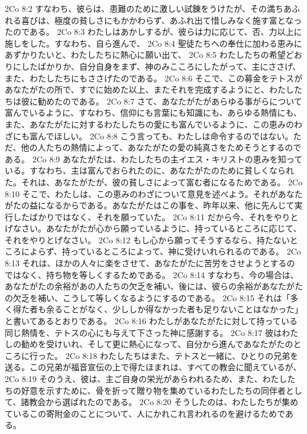 2Co 8:2  すなわち、彼らは、患難のために激しい試錬をうけたが、その満ちあふれる喜びは、極度の貧しさにもかかわらず、あふれ出て惜しみなく施す富となったのである。
2Co 8:3  わたしはあかしするが、彼らは力に応じて、否、力以上に施しをした。すなわち、自ら進んで、
2Co 8:4  聖徒たちへの奉仕に加わる恵みにあずかりたいと、わたしたちに熱心に願い出て、
2Co 8:5  わたしたちの希望どおりにしたばかりか、自分自身をまず、神のみこころにしたがって、主にささげ、また、わたしたちにもささげたのである。
2Co 8:6  そこで、この募金をテトスがあなたがたの所で、すでに始めた以上、またそれを完成するようにと、わたしたちは彼に勧めたのである。
2Co 8:7  さて、あなたがたがあらゆる事がらについて富んでいるように、すなわち、信仰にも言葉にも知識にも、あらゆる熱情にも、また、あなたがたに対するわたしたちの愛にも富んでいるように、この恵みのわざにも富んでほしい。
2Co 8:8  こう言っても、わたしは命令するのではない。ただ、他の人たちの熱情によって、あなたがたの愛の純真さをためそうとするのである。
2Co 8:9  あなたがたは、わたしたちの主イエス・キリストの恵みを知っている。すなわち、主は富んでおられたのに、あなたがたのために貧しくなられた。それは、あなたがたが、彼の貧しさによって富む者になるためである。
2Co 8:10  そこで、わたしは、この恵みのわざについて意見を述べよう。それがあなたがたの益になるからである。あなたがたはこの事を、昨年以来、他に先んじて実行したばかりではなく、それを願っていた。
2Co 8:11  だから今、それをやりとげなさい。あなたがたが心から願っているように、持っているところに応じて、それをやりとげなさい。
2Co 8:12  もし心から願ってそうするなら、持たないところによらず、持っているところによって、神に受けいれられるのである。
2Co 8:13  それは、ほかの人々に楽をさせて、あなたがたに苦労をさせようとするのではなく、持ち物を等しくするためである。
2Co 8:14  すなわち、今の場合は、あなたがたの余裕があの人たちの欠乏を補い、後には、彼らの余裕があなたがたの欠乏を補い、こうして等しくなるようにするのである。
2Co 8:15  それは「多く得た者も余ることがなく、少ししか得なかった者も足りないことはなかった」と書いてあるとおりである。
2Co 8:16  わたしがあなたがたに対して持っている同じ熱情を、テトスの心にも与えて下さった神に感謝する。
2Co 8:17  彼はわたしの勧めを受けいれ、そして更に熱心になって、自分から進んであなたがたのところに行った。
2Co 8:18  わたしたちはまた、テトスと一緒に、ひとりの兄弟を送る。この兄弟が福音宣伝の上で得たほまれは、すべての教会に聞えているが、
2Co 8:19  そのうえ、彼は、主ご自身の栄光があらわれるため、また、わたしたちの好意を示すために、骨を折って贈り物を集めているわたしたちの同伴者として、諸教会から選ばれたのである。
2Co 8:20  そうしたのは、わたしたちが集めているこの寄附金のことについて、人にかれこれ言われるのを避けるためである。
